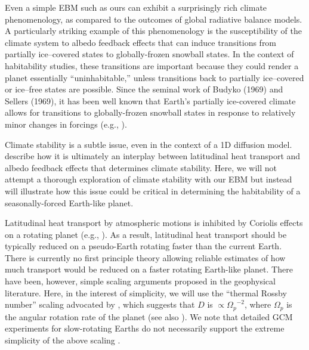 Even a simple EBM such as ours can exhibit a surprisingly rich climate
phenomenology, as compared to the outcomes of global radiative balance
models. A particularly striking example of this phenomenology is the
susceptibility of the climate system to albedo feedback effects that
can induce transitions from partially ice--covered states to
globally-frozen snowball states. In the context of habitability
studies, these transitions are important because they could render a
planet essentially ``uninhabitable,'' unless transitions back to
partially ice--covered or ice--free states are possible. Since the
seminal work of Budyko (1969) and Sellers (1969), it has been well
known that Earth's partially ice-covered climate allows for
transitions to globally-frozen snowball states in response to
relatively minor changes in forcings (e.g.,
\citet{hartmann1994,ghil2002,hoffman+schrag2002}).

Climate stability is a subtle issue, even in the context of a 1D
diffusion model. \citet{held_et_al1981} describe how it is ultimately
an interplay between latitudinal heat transport and albedo feedback
effects that determines climate stability.  Here, we will not attempt
a thorough exploration of climate stability with our EBM but instead
will illustrate how this issue could be critical in determining the
habitability of a seasonally-forced Earth-like planet.

Latitudinal heat transport by atmospheric motions is inhibited by
Coriolis effects on a rotating planet (e.g.,
\citet{pedlosky1982,holton1992}). As a result, latitudinal heat
transport should be typically reduced on a pseudo-Earth rotating
faster than the current Earth. There is currently no first principle
theory allowing reliable estimates of how much transport would be
reduced on a faster rotating Earth-like planet. There have been,
however, simple scaling arguments proposed in the geophysical
literature.  Here, in the interest of simplicity, we will use the
``thermal Rossby number'' scaling advocated by \citet{farrell1990},
which suggests that $D$ is $\propto {\Omega_p}^{-2}$, where $\Omega_p$
is the angular rotation rate of the planet (see also
\citealt{stone1973}). We note that detailed GCM experiments for
slow-rotating Earths do not necessarily support the extreme simplicity
of the above scaling \citep{delgenio_et_al1993,delgenio+zhou1996}.

